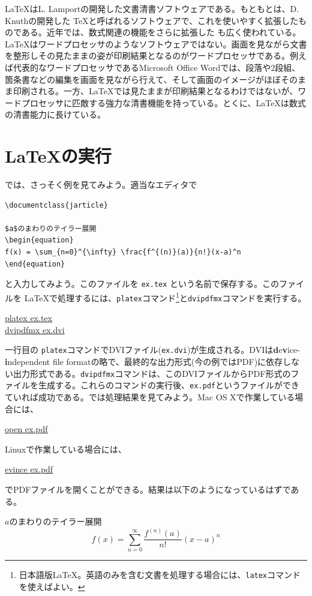 \LaTeX はL. Lamportの開発した文書清書ソフトウェアである。もともとは、D. Knuthの開発した \TeX と呼ばれるソフトウェアで、これを使いやすく拡張したものである。近年では、数式関連の機能をさらに拡張した \AmSLaTeX も広く使われている。\LaTeX はワードプロセッサのようなソフトウェアではない。画面を見ながら文書を整形しその見たままの姿が印刷結果となるのがワードプロセッサである。例えば代表的なワードプロセッサであるMicrosoft Office Wordでは、段落や2段組、箇条書などの編集を画面を見ながら行えて、そして画面のイメージがほぼそのまま印刷される。一方、\LaTeX では見たままが印刷結果となるわけではないが、ワードプロセッサに匹敵する強力な清書機能を持っている。とくに、\LaTeX は数式の清書能力に長けている。

\section{\LaTeX の実行}
\label{sec:latex:intro}

では、さっそく例を見てみよう。適当なエディタで
\begin{reidai}
\label{reidai:latex:ex}
\begin{verbatim}
\documentclass{jarticle}

$a$のまわりのテイラー展開
\begin{equation}
f(x) = \sum_{n=0}^{\infty} \frac{f^{(n)}(a)}{n!}(x-a)^n
\end{equation}

\end{verbatim}
\end{reidai} \noindent
と入力してみよう。このファイルを \texttt{ex.tex} という名前で保存する。このファイルを \LaTeX で処理するには、\texttt{platex}コマンド\footnote{日本語版\LaTeX 。英語のみを含む文書を処理する場合には、\texttt{latex}コマンドを使えばよい。}と\texttt{dvipdfmx}コマンドを実行する。
\begin{commandline2}
\prompt \underline{platex ex.tex}\\
\prompt \underline{dvipdfmx ex.dvi}
\end{commandline2} \noindent
一行目の \texttt{platex}コマンドでDVIファイル(\texttt{ex.dvi})が生成される。DVIは{\textbf{d}e\textbf{v}ice-\textbf{i}ndependent file format}の略で、最終的な出力形式(今の例ではPDF)に依存しない出力形式である。\texttt{dvipdfmx}コマンドは、このDVIファイルからPDF形式のファイルを生成する。これらのコマンドの実行後、\texttt{ex.pdf}というファイルができていれば成功である。では処理結果を見てみよう。Mac OS Xで作業している場合には、
\begin{commandline2}
\prompt \underline{open ex.pdf}
\end{commandline2} \noindent
Linuxで作業している場合には、
\begin{commandline2}
\prompt \underline{evince ex.pdf}
\end{commandline2} \noindent
でPDFファイルを開くことができる。結果は以下のようになっているはずである。
\renewcommand{\theequation}{1}
\begin{kekka}
\label{kekka:ex}
$a$のまわりのテイラー展開
\begin{equation}
 f(x) = \sum_{n=0}^{\infty} \frac{f^{(n)}(a)}{n!}(x-a)^n
\end{equation}
\vspace{0pt}
\end{kekka}

